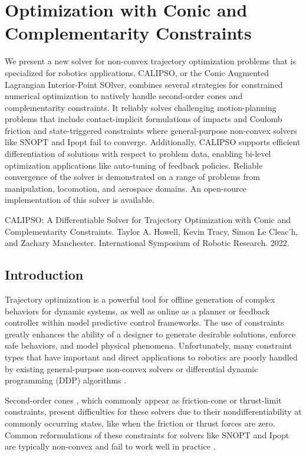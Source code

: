 \chapter{Optimization with Conic and Complementarity Constraints}
We present a new solver for non-convex trajectory optimization problems that is specialized for robotics applications. CALIPSO, or the Conic Augmented Lagrangian Interior-Point SOlver, combines several strategies for constrained numerical optimization to natively handle second-order cones and complementarity constraints. It reliably solves challenging motion-planning problems that include contact-implicit formulations of impacts and Coulomb friction and state-triggered constraints where general-purpose non-convex solvers like SNOPT and Ipopt fail to converge. Additionally, CALIPSO supports efficient differentiation of solutions with respect to problem data, enabling bi-level optimization applications like auto-tuning of feedback policies. Reliable convergence of the solver is demonstrated on a range of problems from manipulation, locomotion, and aerospace domains. An open-source implementation of this solver is available.

\vspace*{\fill}

\noindent CALIPSO: A Differentiable Solver for Trajectory Optimization with Conic and Complementarity Constraints. Taylor A. Howell, Kevin Tracy, Simon Le Cleac'h, and Zachary Manchester. International Symposium of Robotic Research. 2022.

\pagebreak 

\section{Introduction}
Trajectory optimization is a powerful tool for offline generation of complex behaviors for dynamic systems, as well as online as a planner or feedback controller within model predictive control frameworks.  The use of constraints greatly enhances the ability of a designer to generate desirable solutions, enforce safe behaviors, and model physical phenomena. Unfortunately, many constraint types that have important and direct applications to robotics are poorly handled by existing general-purpose non-convex solvers \cite{nocedal2006numerical} or differential dynamic programming (DDP) algorithms \cite{jacobson1970differential}. 

Second-order cones \cite{boyd2004convex}, which commonly appear as friction-cone \cite{moreau2011unilateral} or thrust-limit \cite{blackmore2010minimum} constraints, present difficulties for these solvers due to their nondifferentiability at commonly occurring states, like when the friction or thrust forces are zero. Common reformulations of these constraints for solvers like SNOPT \cite{gill2005snopt} and Ipopt \cite{wachter2006implementation} are typically non-convex and fail to work well in practice \cite{vanderbei1998using}.

